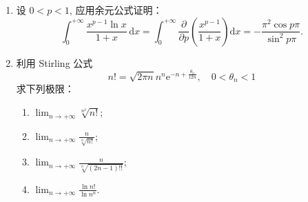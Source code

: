 \begin{enumerate}
  \item 设 $0<p<1$, 应用余元公式证明：
  \[
    \int_{0}^{+\infty}\frac{x^{p-1}\ln x}{1+x}\,\mathrm{d}x=\int_{0}^{+\infty}\frac{\partial}{\partial p}\left(\frac{x^{p-1}}{1+x}\right)\mathrm{d}x=-\frac{\pi^{2}\cos p\pi}{\sin^{2}p\pi}.
\]
  \item 利用 Stirling 公式
  \[
    n!=\sqrt{2\pi n}n^{n}\mathrm{e}^{-n+\frac{\theta_{n}}{12n}},\quad 0<\theta_{n}<1
\]
  求下列极限：
  \begin{enumerate}
    \item $\displaystyle\lim_{n\to+\infty}\sqrt[n^{2}]{n!}$;
    \item $\displaystyle\lim_{n\to+\infty}\frac{n}{\sqrt[n]{n!}}$;
    \item $\displaystyle\lim_{n\to+\infty}\frac{n}{\sqrt[n]{(2n-1)!!}}$;
    \item $\displaystyle\lim_{n\to+\infty}\frac{\ln n!}{\ln n^{n}}$.
  \end{enumerate}
\end{enumerate}

